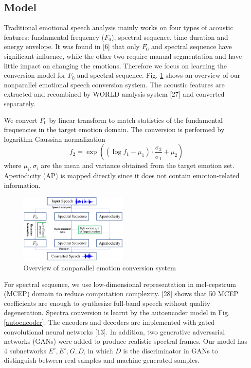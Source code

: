 \documentclass{article}
\begin{document}
\subsection{Model}
Traditional emotional speech analysis mainly works on four types of acoustic features: fundamental frequency ($F_0$), spectral sequence, time duration and energy envelope. It was found in [6] that only $F_0$ and spectral sequence have significant influence, while the other two require manual segmentation and have little impact on changing the emotions. Therefore we focus on learning the conversion model for $F_0$ and spectral sequence. Fig. \ref{model} shows an overview of our nonparallel emotional speech conversion system. The acoustic features are extracted and recombined by WORLD analysis system [27] and converted separately.

We convert $F_0$ by linear transform to match statistics of the fundamental frequencies in the target emotion domain. The conversion is performed by logarithm Gaussian normalization
\begin{equation}
f_2 = \exp((\log f_1 - \mu_1)\cdot\frac{\sigma_2}{\sigma_1} + \mu_2)
\label{eq:f0}
\end{equation}
where $\mu_i, \sigma_i$ are the mean and variance obtained from the target emotion set. Aperiodicity (AP) is mapped directly since it does not contain emotion-related information.

\begin{figure}[htb]
\includegraphics[width=0.48\textwidth]{FIG/model}
\caption{Overview of nonparallel emotion conversion system}
\label{model}
\end{figure}

For spectral sequence, we use low-dimensional representation in mel-cepstrum (MCEP) domain to reduce computation complexity. [28] shows that 50 MCEP coefficients are enough to synthesize full-band speech without quality degeneration. Spectra conversion is learnt by the autoencoder model in Fig. \ref{autoencoder}. The encoders and decoders are implemented with gated convolutional neural networks [13]. In addition, two generative adversarial networks (GANs) were added to produce realistic spectral frames. Our model has 4 subnetworks $E^c, E^s, G, D$, in which $D$ is the discriminator in GANs to distinguish between real samples and machine-generated samples.
\end{document}
